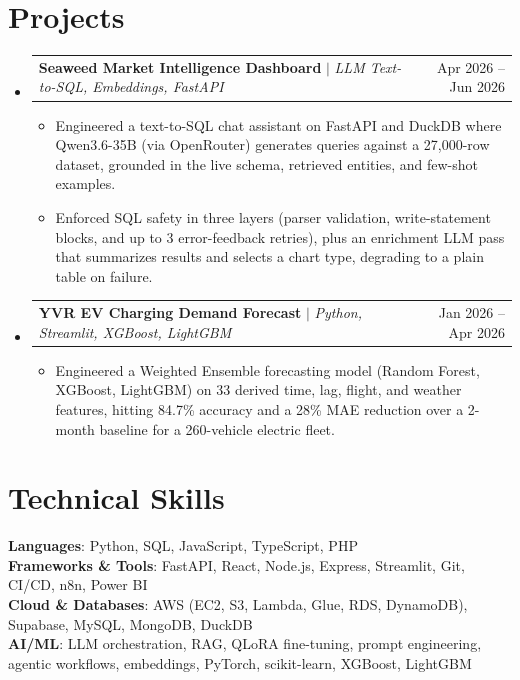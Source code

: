 \documentclass[letterpaper,11pt]{article}
\makeatletter
\newcommand{\resumeItem}[1]{
  \item\small{
    {#1 \vspace{-2pt}}
  }
}
\newcommand{\resumeProjectHeading}[2]{
    \item
    \begin{tabular*}{0.97\textwidth}{l@{\extracolsep{\fill}}r}
      \small#1 & #2 \\
    \end{tabular*}\vspace{-7pt}
}
\newcommand{\resumeSubHeadingListStart}{\begin{itemize}[leftmargin=0.15in, label={}]}
\newcommand{\resumeSubHeadingListEnd}{\end{itemize}}
\newcommand{\resumeItemListStart}{\begin{itemize}}
\newcommand{\resumeItemListEnd}{\end{itemize}\vspace{-5pt}}
\makeatother
\begin{document}
\section{Projects}
    \resumeSubHeadingListStart
      \resumeProjectHeading
          {\textbf{Seaweed Market Intelligence Dashboard} $|$ \emph{LLM Text-to-SQL, Embeddings, FastAPI}}{Apr 2026 -- Jun 2026}
          \resumeItemListStart
            \resumeItem{Engineered a text-to-SQL chat assistant on FastAPI and DuckDB where Qwen3.6-35B (via OpenRouter) generates queries against a 27,000-row dataset, grounded in the live schema, retrieved entities, and few-shot examples.}
            \resumeItem{Enforced SQL safety in three layers (parser validation, write-statement blocks, and up to 3 error-feedback retries), plus an enrichment LLM pass that summarizes results and selects a chart type, degrading to a plain table on failure.}
          \resumeItemListEnd
      \resumeProjectHeading
          {\textbf{YVR EV Charging Demand Forecast} $|$ \emph{Python, Streamlit, XGBoost, LightGBM}}{Jan 2026 -- Apr 2026}
          \resumeItemListStart
            \resumeItem{Engineered a Weighted Ensemble forecasting model (Random Forest, XGBoost, LightGBM) on 33 derived time, lag, flight, and weather features, hitting 84.7\% accuracy and a 28\% MAE reduction over a 2-month baseline for a 260-vehicle electric fleet.}
          \resumeItemListEnd
    \resumeSubHeadingListEnd

\section{Technical Skills}
 \begin{itemize}[leftmargin=0.15in, label={}]
    \small{\item{
     \textbf{Languages}{: Python, SQL, JavaScript, TypeScript, PHP} \\
     \textbf{Frameworks \& Tools}{: FastAPI, React, Node.js, Express, Streamlit, Git, CI/CD, n8n, Power BI} \\
     \textbf{Cloud \& Databases}{: AWS (EC2, S3, Lambda, Glue, RDS, DynamoDB), Supabase, MySQL, MongoDB, DuckDB} \\
     \textbf{AI/ML}{: LLM orchestration, RAG, QLoRA fine-tuning, prompt engineering, agentic workflows, embeddings, PyTorch, scikit-learn, XGBoost, LightGBM}
    }}
 \end{itemize}

\end{document}
